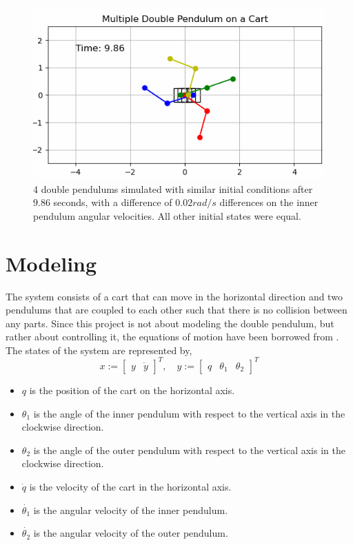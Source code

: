 \documentclass{LTHtwocol} %
\begin{document}
\begin{figure}[H]
	\centering
	\includegraphics[width=0.9\columnwidth]{figures/Double_Pendulum_Chaotic.PNG}
	\caption{4 double pendulums simulated with similar initial conditions after $9.86$ seconds, with a difference of $0.02 rad/s$ differences on the inner pendulum angular velocities. All other initial states were equal.}
	\label{fig:double_pendulum_chaotic}
\end{figure}

\section{Modeling}
The system consists of a cart that can move in the horizontal direction and two pendulums that are coupled to each other such that there is no collision between any parts.
Since this project is not about modeling the double pendulum, but rather about controlling it, the equations of motion have been borrowed from \cite{Double_Pendulum_Equations}.
The states of the system are represented by,
\begin{equation}
x  :=
\begin{bmatrix}
y & \dot{y}
\end{bmatrix}
^T , \quad y :=
\begin{bmatrix}
q & \theta_1 & \theta_2
\end{bmatrix}
^T
\end{equation}
\begin{itemize}
\item $q$ is the position of the cart on the horizontal axis.
\item $\theta_1$ is the angle of the inner pendulum with respect to the vertical axis in the clockwise direction.
\item $\theta_2$ is the angle of the outer pendulum with respect to the vertical axis in the clockwise direction.
\item $\dot{q}$ is the velocity of the cart in the horizontal axis.
\item $\dot{\theta_1}$ is the angular velocity of the inner pendulum.
\item $\dot{\theta_2}$ is the angular velocity of the outer pendulum.
\end{itemize}
\end{document}
